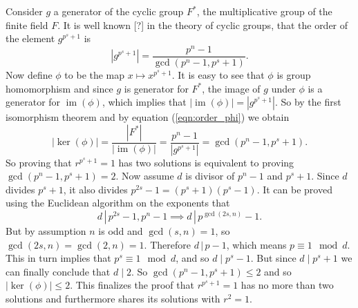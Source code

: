 \documentclass[a4paper]{article}
\DeclareMathOperator{\im}{im}
\begin{document}
  Consider $g$ a generator of the cyclic group $F^{*}$, the
  multiplicative group of the finite field $F$. It is well
  known [?] in the theory of cyclic groups, that the order
  of the element $g^{p^{s}+1}$ is
  \begin{equation}
    \label{eqn:order_phi}
    \left|g^{p^{s}+1}\right|
    = \frac{p^{n}-1}{\gcd\left( p^{n}-1, p^{s}+1 \right) }.
  \end{equation} 
  Now define $\phi$ to be the map $x \mapsto x^{p^{s}+1}$.
  It is easy to see that $\phi$ is group homomorphism and
  since $g$ is generator for $F^{*}$, the image of $g$ under
  $\phi$ is a generator for $\im(\phi)$, which implies that
  $|\im(\phi)| = \left|g^{p^{s}+1}\right|$. So by the first
  isomorphism theorem and by equation (\ref{eqn:order_phi})
  we obtain
  \begin{equation}
    |\ker(\phi)|
    = \frac{|F^{*}|}{|\im(\phi)|}
    = \frac{p^{n}-1}{\left|g^{p^{s}+1}\right|}
    = \gcd(p^{n}-1, p^{s}+1).
  \end{equation}
  So proving that $r^{p^{s}+1}=1$ has two solutions is
  equivalent to proving $\gcd(p^{n}-1, p^{s}+1) = 2$. Now
  assume $d$ is divisor of $p^{n}-1$ and $p^{s}+1$. Since
  $d$ divides $p^{s}+1$, it also divides $p^{2s}-1 = \left(
  p^{s}+1\right) \left( p^{s}-1 \right)$. It can be proved
  using the Euclidean algorithm on the exponents that 
  \[
    d \, | \, p^{2s}-1, p^{n}-1
    \implies
    d \, | \, p^{\gcd(2s, n)} - 1.
  \] 
  But by assumption $n$ is odd and $\gcd(s,n) = 1$, so
  $\gcd(2s, n) = \gcd(2, n) = 1$. Therefore $d \, | \, p -
  1$, which means $p \equiv 1 \mod d$. This in turn implies
  that $p^{s} \equiv 1 \mod d$, and so $d \mid p^{s} - 1$.
  But since $d \mid p^{s} + 1$ we can finally conclude that
  $d \mid 2$. So $\gcd(p^{n}-1, p^{s}+1) \leq 2$ and so
  $|\ker(\phi)| \leq 2$. This finalizes the proof that
  $r^{p^{s}+1} = 1$ has no more than two solutions and
  furthermore shares its solutions with $r^{2} = 1$. 

  
\end{document}
